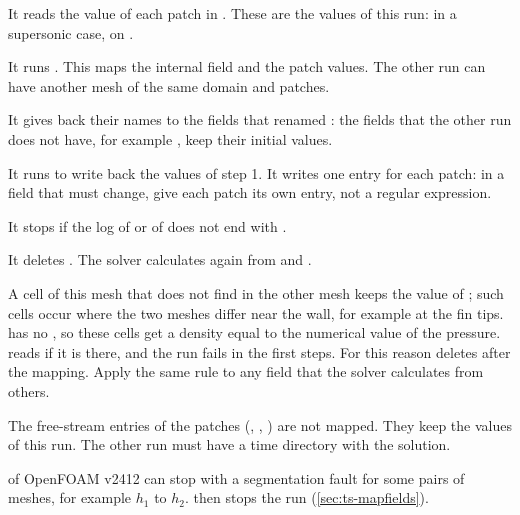 \begin{steps}
\item It reads the value of each  patch in . These are the
  values of this run: in a supersonic case,  on .
\item It runs . This maps
  the internal field and the patch values. The other run can have another mesh of
  the same domain and patches.
\item It gives back their names to the fields that  renamed
  : the fields that the other run does not have, for example
  , keep their initial values.
\item It runs  to write back the values of step 1. It writes one
  entry for each patch: in a field that  must change, give each
   patch its own entry, not a regular expression.
\item It stops if the log of  or of  does not end
  with .
\item It deletes . The solver calculates  again from  and
  .
\end{steps}

\begin{caution}
A cell of this mesh that  does not find in the other mesh keeps the
value of ; such cells occur where the two meshes differ near the wall,
for example at the fin tips.  has no , so these cells get a
density equal to the numerical value of the pressure.  reads
 if it is there, and the run fails in the first steps. For this reason
 deletes  after the mapping. Apply the same rule to any
field that the solver calculates from others.
\end{caution}

The free-stream entries of the patches (, ,
) are not mapped. They keep the values of this run. The other run must
have a time directory with the solution.

\begin{caution}
 of OpenFOAM v2412 can stop with a segmentation fault for some pairs
of meshes, for example $h_1$ to $h_2$.  then stops the run
(\cref{sec:ts-mapfields}).
\end{caution}

